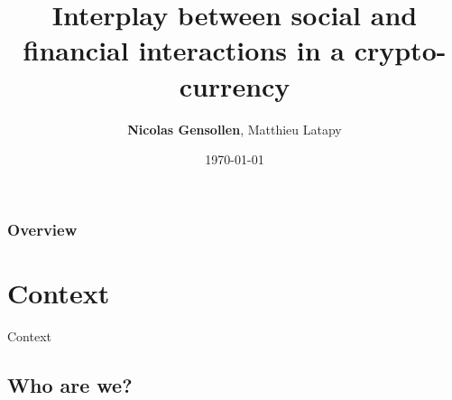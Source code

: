 \documentclass{beamer}
\title[social and financial interactions]{Interplay between social and financial interactions in a crypto-currency } %
\author{\textbf{Nicolas Gensollen}, Matthieu Latapy} %
\institute[LIP6] %
{
Laboratoire d'informatique de Paris 6 \\ %
\medskip
\textit{nicolas.gensollen@lip6.fr} %
}
\date{\today} %
\begin{document}
\begin{frame}
\titlepage %
\end{frame}

\begin{frame}
\frametitle{Overview} %
\tableofcontents %
\end{frame}




\section{Context} 

\begin{frame}
\Huge{\centerline{Context}}
\end{frame}


\subsection{Who are we?}
\end{document}

